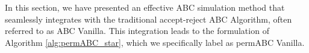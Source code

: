 In this section, we have presented an effective ABC simulation method that seamlessly integrates with the traditional accept-reject ABC Algorithm, often referred to as ABC Vanilla. This integration leads to the formulation of Algorithm \ref{alg:permABC_star}, which we specifically label as permABC Vanilla.




                

